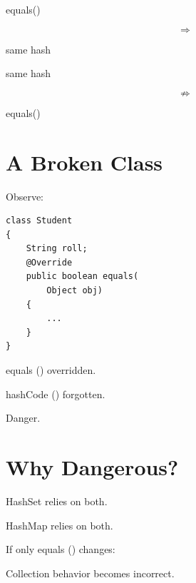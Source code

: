 \documentclass[11pt,a4paper]{book}
\begin{document}
\begin{mentalmodel}

equals()

\[
\Rightarrow
\]

same hash


same hash

\[
\not\Rightarrow
\]

equals()

\end{mentalmodel}


\section{A Broken Class}

Observe:

\begin{verbatim} 
class Student
{
    String roll;
    @Override
    public boolean equals(
        Object obj)
    {
        ...
    }
}
\end{verbatim}


equals () overridden.


hashCode () forgotten.


Danger.


\section{Why Dangerous?}

HashSet relies on both.


HashMap relies on both.


If only equals () changes:


Collection behavior becomes incorrect.
\end{document}
